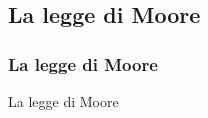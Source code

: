 \subsection[La legge di Moore]{La legge di Moore}
\begin{frame}
	\frametitle{La legge di Moore}
	
	\begin{block}{La legge di Moore}
	
	\end{block}
	
\end{frame}
